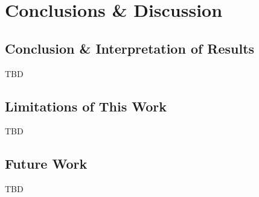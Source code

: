 % 
\chapter{Conclusions \& Discussion}

\section{Conclusion \& Interpretation of Results}

TBD


\section{Limitations of This Work}

TBD

\section{Future Work}

TBD